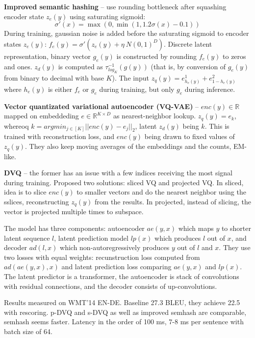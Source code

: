 \textbf{Improved semantic hashing} -- use rounding bottleneck after squashing
encoder state $z_e(y)$ using saturating sigmoid:
\begin{equation}
  \sigma'(x) = \max(0, \min(1, 1.2 \sigma(x) - 0.1))
\end{equation}
During training, gaussian noise is added before the saturating sigmoid to
encoder states $z_e(y)$: $f_e(y) = \sigma'(z_e(y) + \eta ~ N(0,1)^D)$. Discrete
latent representation, binary vector $g_e(y)$ is constructed by rounding
$f_e(y)$ to zeros and ones. $z_d(y)$ is computed as $\tau^{-1}_{log_K}(g(y))$
(that is, by conversion of $g_e(y)$ from binary to decimal with base $K$). The
input $z_q(y) = e^1_{h_e(y)} + e^2_{1-h_e(y)}$ where $h_e(y)$ is either $f_e$ or
$g_e$ during training, but only $g_e$ during inference.

\textbf{Vector quantizated variational autoencoder (VQ-VAE)} --
$enc(y)\in\mathbb{R}$ mapped on embeddeding $e\in\mathbb{R}^{K\times D}$ as
nearest-neighbor lookup. $z_q(y) = e_k$, whereoq
$k = argmin_{j\in[K]} || enc(y) - e_j ||_2$, latent $z_d(y)$ being $k$. This is
trained with reconstruction loss, and $enc(y)$ being drawn to fixed values of
$z_q(y)$. They also keep moving averages of the embeddings and the counts,
EM-like.

\textbf{DVQ} -- the former has an issue with a few indices receiving the most signal
during training. Proposed two solutions: sliced VQ and projected VQ. In sliced,
idea is to slice $enc(y)$ to smaller vectors and do the nearest neighbor using
the sslices, reconstructing $z_q(y)$ from the results. In projected, instead of
slicing, the vector is projected multiple times to subspace.

The model has three components: autoencoder $ae(y, x)$ which maps $y$ to shorter
latent sequence $l$, latent prediction model $lp(x)$ which produces $l$ out of
$x$, and decoder $ad(l, x)$ which non-autoregressively produces $y$ out of $l$
and $x$. They use two losses with equal weights: recunstruction loss computed
from $ad(ae(y,x),x)$ and latent prediction loss comparing $ae(y,x)$ and $lp(x)$.
The latent predictor is a transformer, the autoencoder is stack of convolutions
with residual connections, and the decoder consists of up-convolutions.

Results measured on WMT'14 EN-DE. Baseline 27.3 BLEU, they achieve 22.5 with
rescoring. p-DVQ and s-DVQ as well as improved semhash are comparable, semhash
seems faster. Latency in the order of 100 ms, 7-8 ms per sentence with batch
size of 64.

